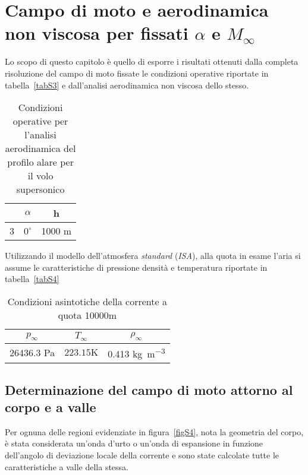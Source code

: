 
\chapter{Campo di moto e aerodinamica non viscosa per fissati $\alpha$ e $M_{\infty}$}
Lo scopo di questo capitolo è quello di esporre i risultati ottenuti dalla completa risoluzione del campo di moto fissate le condizioni operative riportate in tabella~\vref{tabS3} e dall'analisi aerodinamica non viscosa dello stesso.

\begin{table} [!h]\centering {}
	\begin{tabular}{c c c}
		\toprule
		\emph{\Minf } &  $\alpha$ & h \\ 
		\midrule
		3 & $0^{\circ}$ & 1000 m \\
		\bottomrule
	\end{tabular}
	\caption {\footnotesize Condizioni operative per l'analisi aerodinamica del profilo alare per il volo supersonico}
	\label{tabS3}
\end{table}

Utilizzando il modello dell'atmosfera \emph{standard} (\emph{ISA}), alla quota in esame l'aria si assume le caratteristiche di pressione densità e temperatura riportate in tabella~\vref{tabS4}

\begin{table} [!h]\centering {}
	\begin{tabular}{c c c}
		\toprule
		\emph{$p_{\infty}$ } &  \emph{$T_{\infty}$ } & \emph{$\rho_{\infty}$ } \\ 
		\midrule
		26436.3 \si{\pascal} & $223.15 \si{\kelvin}$ & 0.413 \si{\kilo\gram\per\cubic\meter}\\
		\bottomrule
	\end{tabular}
	\caption {\footnotesize Condizioni asintotiche della corrente a quota 10000\si{\meter}}
	\label{tabS4}
\end{table} 

\section{Determinazione del campo di moto attorno al corpo e a valle}
Per ognuna delle regioni evidenziate in figura~\vref{figS4},
nota la geometria del corpo, è stata considerata un'onda d'urto o un'onda di espansione in funzione dell'angolo di deviazione locale della corrente e sono state calcolate tutte le caratteristiche a valle della stessa.

